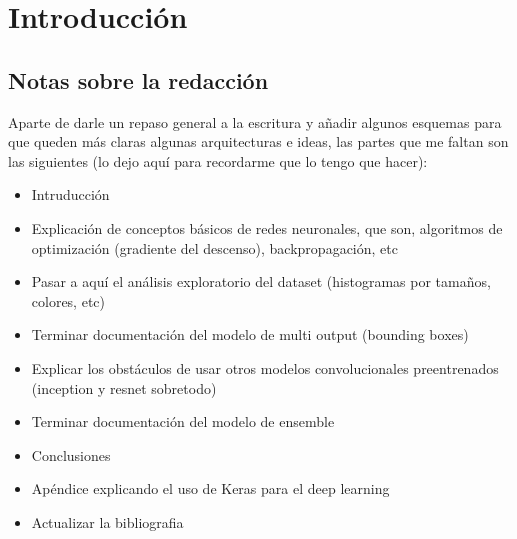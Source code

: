 
\chapter{Introducción} %

\label{Chapter1} %


\newcommand{\keyword}[1]{\textbf{#1}}
\newcommand{\tabhead}[1]{\textbf{#1}}
\newcommand{\code}[1]{\texttt{#1}}
\newcommand{\file}[1]{\texttt{\bfseries#1}}
\newcommand{\option}[1]{\texttt{\itshape#1}}


\section{Notas sobre la redacción}

Aparte de darle un repaso general a la escritura y añadir algunos esquemas para que queden más claras algunas arquitecturas e ideas, las partes que me faltan son las siguientes (lo dejo aquí para recordarme que lo tengo que hacer):

\begin{itemize}
    \item{Intruducción}
    \item{Explicación de conceptos básicos de redes neuronales, que son, algoritmos de optimización (gradiente del descenso), backpropagación, etc}
    \item{Pasar a aquí el análisis exploratorio del dataset (histogramas por tamaños, colores, etc)}
    \item{Terminar documentación del modelo de multi output (bounding boxes)}
    \item{Explicar los obstáculos de usar otros modelos convolucionales preentrenados (inception y resnet sobretodo)}
    \item{Terminar documentación del modelo de ensemble}
    \item{Conclusiones}
    \item{Apéndice explicando el uso de Keras para el deep learning}
    \item{Actualizar la bibliografia}
\end{itemize}




